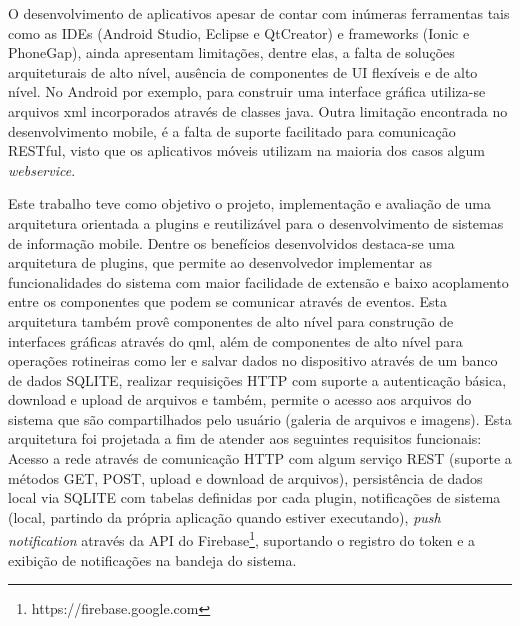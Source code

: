 O desenvolvimento de aplicativos apesar de contar com inúmeras ferramentas tais como as IDEs (Android Studio, Eclipse e QtCreator) e frameworks (Ionic e PhoneGap), ainda apresentam limitações, dentre elas, a falta de soluções arquiteturais de alto nível, ausência de componentes de UI flexíveis e de alto nível. No Android por exemplo, para construir uma interface gráfica utiliza-se arquivos xml incorporados através de classes java. Outra limitação encontrada no desenvolvimento mobile, é a falta de suporte facilitado para comunicação RESTful, visto que os aplicativos móveis utilizam na maioria dos casos algum \textit{webservice}.


Este trabalho teve como objetivo o projeto, implementação e avaliação de uma arquitetura orientada a plugins e reutilizável para o desenvolvimento de sistemas de informação mobile. Dentre os benefícios desenvolvidos destaca-se uma arquitetura de plugins, que permite ao desenvolvedor implementar as funcionalidades do sistema com maior facilidade de extensão e baixo acoplamento entre os componentes que podem se comunicar através de eventos. Esta arquitetura também provê componentes de alto nível para construção de interfaces gráficas através do qml, além de componentes de alto nível para operações rotineiras como ler e salvar dados no dispositivo através de um banco de dados SQLITE, realizar requisições HTTP com suporte a autenticação básica, download e upload de arquivos e também, permite o acesso aos arquivos do sistema que são compartilhados pelo usuário (galeria de arquivos e imagens). Esta arquitetura foi projetada a fim de atender aos seguintes requisitos funcionais: Acesso a rede através de comunicação HTTP com algum serviço REST (suporte a métodos GET, POST, upload e download de arquivos), persistência de dados local via SQLITE com tabelas definidas por cada plugin, notificações de sistema (local, partindo da própria aplicação quando estiver executando), \textit{push notification} através da API do Firebase\footnote{https://firebase.google.com}, suportando o registro do token e a exibição de notificações na bandeja do sistema.


